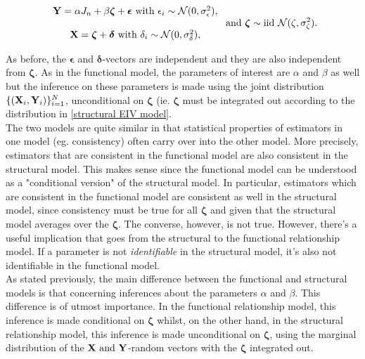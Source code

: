 \documentclass{homework}
\begin{document}
\begin{equation}
    \begin{array}{c}
         {\bf Y} = \alpha J_n + \beta \bm{\zeta} + \bm{\epsilon}  \textnormal{ with } \epsilon_i \sim \mathcal{N}(0, \sigma^2_\epsilon), \\
         \\
         {\bf X} = \bm{\zeta} + \bm{\delta} \textnormal{ with } \delta_i \sim \mathcal{N}(0, \sigma^2_\delta),
    \end{array} \textnormal{ and } \bm{\zeta} \sim \textnormal{iid } \mathcal{N}(\zeta, \sigma_\zeta^2).
    \label{structural EIV model}
\end{equation}

As before, the $\bm{\epsilon}$ and $\bm{\delta}$-vectors are independent and they are also independent from $\bm{\zeta}$. As in the functional model, the parameters of interest are $\alpha$ and $\beta$ as well but the inference on these parameters is made using the joint distribution $\{({\bf X}_i, {\bf Y}_i)\}_{i=1}^{N}$, unconditional on $\bm{\zeta}$ (ie. $\bm{\zeta}$ must be integrated out according to the  distribution in \eqref{structural EIV model}. \\

The two models are quite similar in that statistical properties of estimators in one model (eg. consistency) often carry over into the other model. More precisely, estimators that are consistent in the functional model are also consistent in the structural model. 
This makes sense since the functional model can be understood as a "conditional version" of the structural model. In particular, estimators which are consistent in the functional model are consistent as well in the structural model, since consistency must be true for all $\bm{\zeta}$ and given that the structural model averages over the $\bm{\zeta}$. The converse, however, is not true. However, there's a useful implication that goes from the structural to the functional relationship model. If a parameter is not \textit{identifiable} in the structural model, it's also not identifiable in the functional model. \\

As stated previously, the main difference between the functional and structural models is that concerning inferences about the parameters $\alpha$ and $\beta$. This difference is of utmost importance. In the functional relationship model, this inference is made conditional on $\bm{\zeta}$ whilst, on the other hand, in the structural relationship model, this inference is made unconditional on $\bm{\zeta}$, using the marginal distribution of the ${\bf X} \textnormal{ and } {\bf Y}$-random vectors with the $\bm{\zeta}$ integrated out. 
\end{document}

